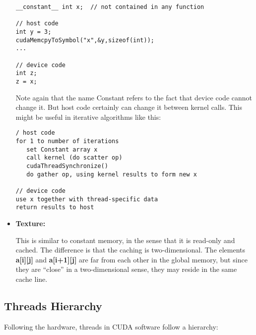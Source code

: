 \begin{itemize}
\begin{Verbatim}[fontsize=\relsize{-2}]
__constant__ int x;  // not contained in any function

// host code
int y = 3;
cudaMemcpyToSymbol("x",&y,sizeof(int));
...

// device code
int z;
z = x;
\end{Verbatim}

Note again that the name Constant refers to the fact that device code
cannot change it.  But host code certainly can change it between kernel
calls.  This might be useful in iterative algorithms like this:

\begin{Verbatim}[fontsize=\relsize{-2}]
/ host code
for 1 to number of iterations
   set Constant array x
   call kernel (do scatter op)
   cudaThreadSynchronize()
   do gather op, using kernel results to form new x

// device code
use x together with thread-specific data
return results to host
\end{Verbatim}

\item {\bf Texture:}

This is similar to constant memory, in the sense that it is read-only
and cached.  The difference is that the caching is two-dimensional.  The
elements {\bf a[i][j]} and {\bf a[i+1][j]} are far from each other in
the global memory, but since they are ``close'' in a two-dimensional
sense, they may reside in the same cache line.

\end{itemize}

\subsection{Threads Hierarchy}
\label{threadshierarchy}

Following the hardware, threads in CUDA software follow a hierarchy:

